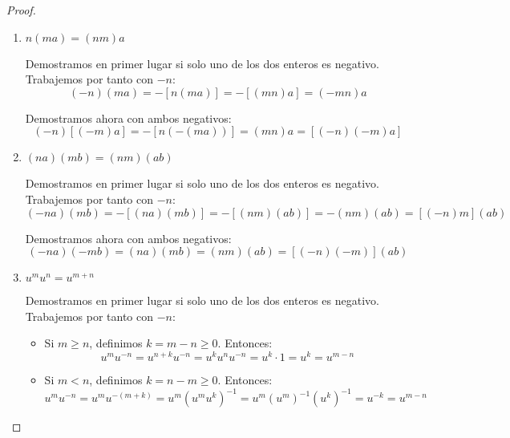 \begin{proof}
\begin{enumerate}
        \item $n(ma) = (nm)a$
        
        Demostramos en primer lugar si solo uno de los dos enteros es negativo. Trabajemos por tanto con $-n$:
        \begin{equation*}
            (-n)(ma) = -[n(ma)] = -[(mn)a] = (-mn)a
        \end{equation*}

        Demostramos ahora con ambos negativos:
        \begin{equation*}
            (-n)[(-m)a] = -[n(-(ma))] = (mn)a = [(-n)(-m)a]
        \end{equation*}
        
        \item $(na)(mb) = (nm)(ab)$
        
        Demostramos en primer lugar si solo uno de los dos enteros es negativo. Trabajemos por tanto con $-n$:
        \begin{equation*}
            (-na)(mb) = -[(na)(mb)] = -[(nm)(ab)] = -(nm)(ab) = [(-n)m](ab)
        \end{equation*}

        Demostramos ahora con ambos negativos:
        \begin{equation*}
            (-na)(-mb) = (na)(mb) = (nm)(ab) = [(-n)(-m)](ab)
        \end{equation*}
        
        \item $u^mu^n = u^{m+n}$

        Demostramos en primer lugar si solo uno de los dos enteros es negativo. Trabajemos por tanto con $-n$:
        \begin{itemize}
            \item Si $m\geq n$, definimos $k=m-n\geq 0$. Entonces:
            \begin{equation*}
                u^mu^{-n} = u^{n+k}u^{-n} = u^ku^nu^{-n} = u^k\cdot 1 = u^k = u^{m-n}
            \end{equation*}

            \item Si $m< n$, definimos $k=n-m\geq 0$. Entonces:
            \begin{equation*}
                u^mu^{-n} = u^m u^{-(m+k)} = u^m(u^mu^k)^{-1} = u^m (u^m)^{-1} (u^k)^{-1} = u^{-k} = u^{m-n}
            \end{equation*}
        \end{itemize}


\end{enumerate}
\end{proof}
